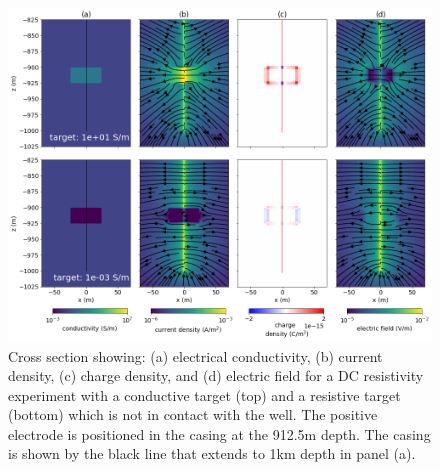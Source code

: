 \begin{figure}
    \begin{center}
    \includegraphics[width=\textwidth]{figures/dc_casing/offset_target_physics.png}
    \end{center}
\caption{
    Cross section showing: (a) electrical conductivity, (b) current density, (c) charge density, and
    (d) electric field for a DC resistivity experiment with a conductive target (top)
    and a resistive target (bottom) which is not in contact with the well.
    The positive electrode is positioned in the casing at the 912.5m depth.
    The casing is shown by the black line that extends to 1km
    depth in panel (a).
}
\label{fig:offset_target_physics}
\end{figure}
